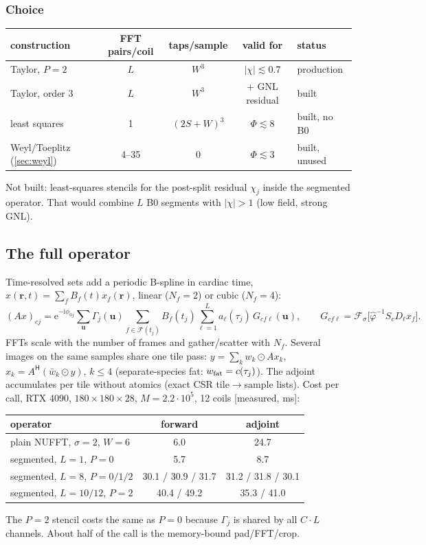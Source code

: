 \documentclass[11pt]{article}
\theoremstyle{remark}
\newcommand{\rr}{\bm r}
\newcommand{\uu}{\bm u}
\newcommand{\ii}{\mathrm i}
\newcommand{\ee}{\mathrm e}
\newcommand{\herm}{\mathsf H}
\newcommand{\Fs}{\mathcal F_\sigma}
\begin{document}
\subsubsection*{Choice}
\begin{center}\small
\begin{tabular}{lcccl}
\toprule
construction & FFT pairs/coil & taps/sample & valid for & status\\
\midrule
Taylor, $P=2$ & $L$ & $W^3$ & $|\chi|\lesssim0.7$ & production\\
Taylor, order 3 & $L$ & $W^3$ & + GNL residual & built\\
least squares & 1 & $(2S{+}W)^3$ & $\Phi\lesssim8$ & built, no B0\\
Weyl/Toeplitz (\cref{sec:weyl}) & 4--35 & 0 & $\Phi\lesssim3$ & built, unused\\
\bottomrule
\end{tabular}
\end{center}
Not built: least-squares stencils for the post-split residual $\chi_j$ inside the segmented operator. That would combine $L$ B0 segments with $|\chi|>1$ (low field, strong GNL).

\subsection{The full operator}
\label{sec:fullop}

Time-resolved sets add a periodic B-spline in cardiac time, $x(\rr,t)=\sum_fB_f(t)x_f(\rr)$, linear ($N_f=2$) or cubic ($N_f=4$):
\begin{equation}
  (Ax)_{cj}=\ee^{-\ii\phi_{0j}}\sum_{\uu}\Gamma_j(\uu)\sum_{f\in\mathcal F(t_j)}B_f(t_j)\sum_{\ell=1}^La_\ell(\tau_j)\,G_{cf\ell}(\uu),\qquad
  G_{cf\ell}=\Fs\bigl[\hat\varphi^{-1}S_cD_\ell x_f\bigr].
  \label{eq:full}
\end{equation}
FFTs scale with the number of frames and gather/scatter with $N_f$. Several images on the same samples share one tile pass:
$y=\sum_kw_k\odot Ax_k$, $x_k=A^\herm(\bar w_k\odot y)$, $k\le4$ (separate-species fat: $w_{\rm fat}=c(\tau_j)$).
The adjoint accumulates per tile without atomics (exact CSR tile$\to$sample lists).
Cost per call, RTX 4090, $180\times180\times28$, $M=2.2\cdot10^5$, 12 coils [measured, ms]:
\begin{center}
\begin{tabular}{lcc}
\toprule
operator & forward & adjoint\\
\midrule
plain NUFFT, $\sigma{=}2$, $W{=}6$ & 6.0 & 24.7\\
segmented, $L{=}1$, $P{=}0$ & 5.7 & 8.7\\
segmented, $L{=}8$, $P=0/1/2$ & 30.1 / 30.9 / 31.7 & 31.2 / 31.8 / 30.1\\
segmented, $L{=}10/12$, $P{=}2$ & 40.4 / 49.2 & 35.3 / 41.0\\
\bottomrule
\end{tabular}
\end{center}
The $P=2$ stencil costs the same as $P=0$ because $\Gamma_j$ is shared by all $C\cdot L$ channels. About half of the call is the memory-bound pad/FFT/crop.
\end{document}
